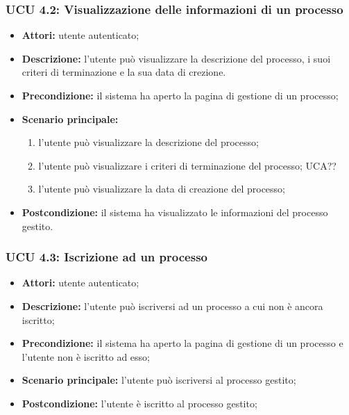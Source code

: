\subsubsection{UCU 4.2: Visualizzazione delle informazioni di un processo}
\begin{itemize}
\item \textbf{Attori:} utente autenticato;
\item \textbf{Descrizione:} l'utente può visualizzare la descrizione del processo, i suoi criteri di terminazione e la sua data di crezione.
\item \textbf{Precondizione:} il sistema ha aperto la pagina di gestione di un processo;
\item \textbf{Scenario principale:}\
\begin{enumerate}
\item l'utente può visualizzare la descrizione del processo;
\item l'utente può visualizzare i criteri di terminazione del processo; UCA??
\item l'utente può visualizzare la data di creazione del processo;
\end{enumerate}
\item \textbf{Postcondizione:} il sistema ha visualizzato le informazioni del processo gestito.
\end{itemize}

\subsubsection{UCU 4.3: Iscrizione ad un processo}
\begin{itemize}
\item \textbf{Attori:} utente autenticato;
\item \textbf{Descrizione:} l'utente può iscriversi ad un processo a cui non è ancora iscritto;
\item \textbf{Precondizione:} il sistema ha aperto la pagina di gestione di un processo e l'utente non è iscritto ad esso;
\item \textbf{Scenario principale:} l'utente può iscriversi al processo gestito;
\item \textbf{Postcondizione:} l'utente è iscritto al processo gestito;
\end{itemize}

